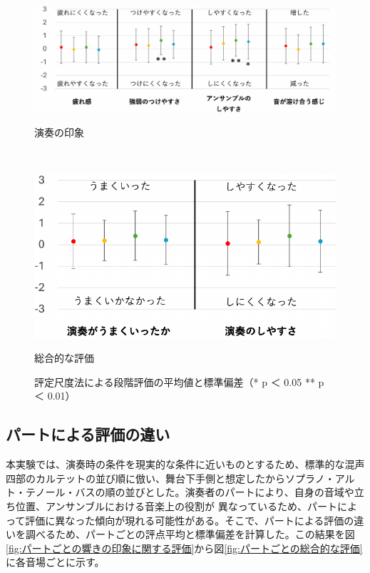 \documentclass[11pt,a4j]{jreport}
\begin{document}
\begin{figure}[H]
  \begin{minipage}{1\linewidth}
    \centering
    \includegraphics[scale=.55]{images/subjectiveExp/statisticAnalysis/03performance_a.pdf}
    \caption*{演奏の印象}
    \label{fig:演奏の印象}
  \end{minipage}
\\
  \vspace{1\baselineskip}
  \begin{minipage}{1\linewidth}
    \centering
    \includegraphics[scale=.55]{images/subjectiveExp/statisticAnalysis/04overall_a.pdf}
    \caption*{総合的な評価}
    \label{fig:総合的な評価}
  \end{minipage}

  \caption{評定尺度法による段階評価の平均値と標準偏差（* p ＜ 0.05 \hspace{5mm} ** p ＜ 0.01）}
  \label{fig:評定尺度法による段階評価の平均値と標準偏差}
\end{figure}

\newpage

\subsection{パートによる評価の違い}
本実験では、演奏時の条件を現実的な条件に近いものとするため、標準的な混声四部のカルテットの並び順に倣い、舞台下手側と想定したからソプラノ・アルト・テノール・バスの順の並びとした。演奏者のパートにより、自身の音域や立ち位置、アンサンブルにおける音楽上の役割が
異なっているため、パートによって評価に異なった傾向が現れる可能性がある。そこで、パートによる評価の違いを調べるため、パートごとの評点平均と標準偏差を計算した。この結果を図\ref{fig:パートごとの響きの印象に関する評価}から図\ref{fig:パートごとの総合的な評価}に各音場ごとに示す。
\end{document}
